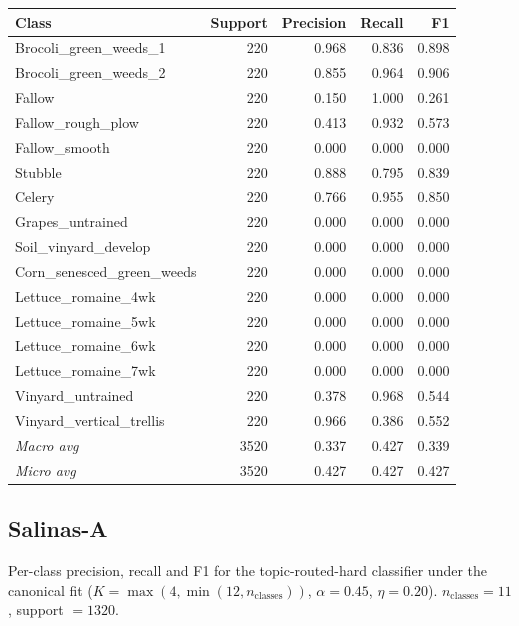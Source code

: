 \begin{tabular}{lrrrr}
\toprule
Class & Support & Precision & Recall & F1 \\
\midrule
Brocoli\_green\_weeds\_1 & 220 & 0.968 & 0.836 & 0.898 \\
Brocoli\_green\_weeds\_2 & 220 & 0.855 & 0.964 & 0.906 \\
Fallow & 220 & 0.150 & 1.000 & 0.261 \\
Fallow\_rough\_plow & 220 & 0.413 & 0.932 & 0.573 \\
Fallow\_smooth & 220 & 0.000 & 0.000 & 0.000 \\
Stubble & 220 & 0.888 & 0.795 & 0.839 \\
Celery & 220 & 0.766 & 0.955 & 0.850 \\
Grapes\_untrained & 220 & 0.000 & 0.000 & 0.000 \\
Soil\_vinyard\_develop & 220 & 0.000 & 0.000 & 0.000 \\
Corn\_senesced\_green\_weeds & 220 & 0.000 & 0.000 & 0.000 \\
Lettuce\_romaine\_4wk & 220 & 0.000 & 0.000 & 0.000 \\
Lettuce\_romaine\_5wk & 220 & 0.000 & 0.000 & 0.000 \\
Lettuce\_romaine\_6wk & 220 & 0.000 & 0.000 & 0.000 \\
Lettuce\_romaine\_7wk & 220 & 0.000 & 0.000 & 0.000 \\
Vinyard\_untrained & 220 & 0.378 & 0.968 & 0.544 \\
Vinyard\_vertical\_trellis & 220 & 0.966 & 0.386 & 0.552 \\
\midrule
\textit{Macro avg} & 3520 & 0.337 & 0.427 & 0.339 \\
\textit{Micro avg} & 3520 & 0.427 & 0.427 & 0.427 \\
\bottomrule
\end{tabular}

\subsection*{Salinas-A}
Per-class precision, recall and F1 for the topic-routed-hard classifier under the canonical fit ($K = \max(4, \min(12, n_{\text{classes}}))$, $\alpha = 0.45$, $\eta = 0.20$). $n_{\text{classes}} = 11$, support $= 1320$.

